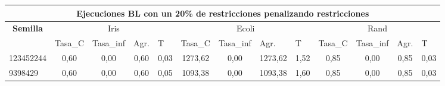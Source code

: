 \documentclass[12pt, spanish]{article}
\begin{document}
\begin{table}[H]
\small

\begin{adjustwidth}{-1.2cm}{-1.2cm}%

\begin{tabular}{|l|c|c|c|c|c|c|c|c|c|c|c|c|}
\hline
\multicolumn{13}{|c|}{\textbf{Ejecuciones BL con un 20\% de restricciones penalizando restricciones}}                                                                                                                                                                                                                                                                                                                  \\ \hline
\multicolumn{1}{|c|}{\multirow{2}{*}{\textbf{Semilla}}} & \multicolumn{4}{c|}{Iris}                                                                                          & \multicolumn{4}{c|}{Ecoli}                                                                                         & \multicolumn{4}{c|}{Rand}                                                                                          \\ \cline{2-13} 
\multicolumn{1}{|c|}{}                                  & \multicolumn{1}{l|}{Tasa\_C} & \multicolumn{1}{l|}{Tasa\_inf} & \multicolumn{1}{l|}{Agr.} & \multicolumn{1}{l|}{T} & \multicolumn{1}{l|}{Tasa\_C} & \multicolumn{1}{l|}{Tasa\_inf} & \multicolumn{1}{l|}{Agr.} & \multicolumn{1}{l|}{T} & \multicolumn{1}{l|}{Tasa\_C} & \multicolumn{1}{l|}{Tasa\_inf} & \multicolumn{1}{l|}{Agr.} & \multicolumn{1}{l|}{T} \\ \hline
123452244                                               & 0,60                         & 0,00                           & 0,60                      & 0,03                   & 1273,62                      & 0,00                           & 1273,62                   & 1,52                   & 0,85                         & 0,00                           & 0,85                      & 0,03                   \\ \hline
9398429                                                 & 0,60                         & 0,00                           & 0,60                      & 0,05                   & 1093,38                      & 0,00                           & 1093,38                   & 1,60                   & 0,85                         & 0,00                           & 0,85                      & 0,03                   \\ \hline

\end{tabular}
\end{adjustwidth}
\end{table}
\end{document}
